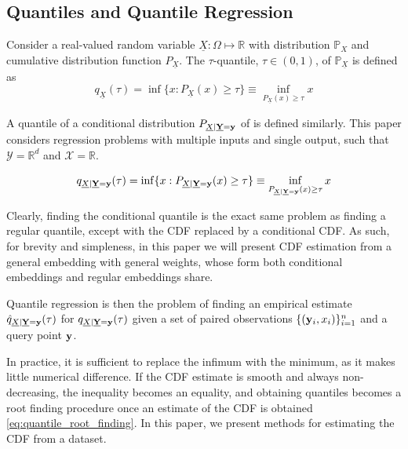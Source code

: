 \documentclass[twoside]{article} \usepackage{aistats2017}
\theoremstyle{definition}
\theoremstyle{remark}
\newcommand{\rv}[1]{\underline{#1}}
\begin{document}
		
	\subsection{Quantiles and Quantile Regression}
	\label{sec:background:quantiles}

		Consider a real-valued random variable $\rv{X} : \Omega \mapsto \mathbb{R}$ with distribution $\mathbb{P}_{X}$ and cumulative distribution function $P_{\rv{X}}$. The $\tau$-quantile, $\tau \in (0, 1)$, of $\mathbb{P}_{\rv{X}}$ is defined as
		\begin{equation}
			q_{\rv{X}}(\tau) = \inf\{x : P_{\rv{X}}(x) \geq \tau\} \equiv \inf_{P_{\rv{X}}(x) \geq \tau} x
		\label{eq:quantile}
		\end{equation}
		
		A quantile of a conditional distribution $P_{\rv{X} | \bvec{\rv{Y}} = \bvec{y}}$ of is defined similarly. This paper considers regression problems with multiple inputs and single output, such that $\mathcal{Y} = \mathbb{R}^{d}$ and $\mathcal{X} = \mathbb{R}$.
		
		\begin{equation}
			q_{\rv{X} | \bvec{\rv{Y}} = \bvec{y}}(\tau) = \inf\{x : P_{\rv{X} | \bvec{\rv{Y}} = \bvec{y}}(x) \geq \tau\} \equiv \inf_{P_{\rv{X} | \bvec{\rv{Y}} = \bvec{y}}(x) \geq \tau} x
		\label{eq:conditional_quantile}
		\end{equation}
		
		Clearly, finding the conditional quantile is the exact same problem as finding a regular quantile, except with the CDF replaced by a conditional CDF. As such, for brevity and simpleness, in this paper we will present CDF estimation from a general embedding with general weights, whose form both conditional embeddings and regular embeddings share.
		
		Quantile regression is then the problem of finding an empirical estimate $\hat{q}_{\rv{X} | \bvec{\rv{Y}} = \bvec{y}}(\tau)$ for $q_{\rv{X} | \bvec{\rv{Y}} = \bvec{y}}(\tau)$ given a set of paired observations $\{(\mathbf{y}_{i}, x_{i})\}_{i = 1}^{n}$ and a query point $\mathbf{y}$.
		
		In practice, it is sufficient to replace the infimum with the minimum, as it makes little numerical difference. If the CDF estimate is smooth and always non-decreasing, the inequality becomes an equality, and obtaining quantiles becomes a root finding procedure once an estimate of the CDF is obtained \eqref{eq:quantile_root_finding}. In this paper, we present methods for estimating the CDF from a dataset.
		
\end{document}
